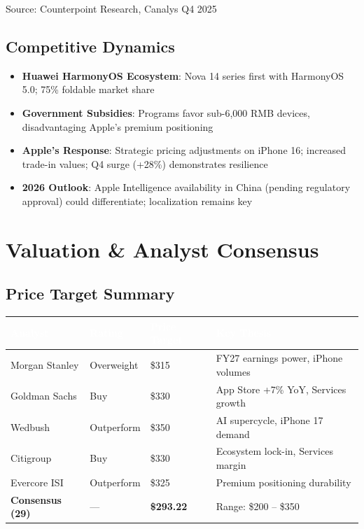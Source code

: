\documentclass[11pt,a4paper]{article}
\begin{document}
\vspace{6pt}
\textcolor{msgray}{\scriptsize Source: Counterpoint Research, Canalys Q4 2025}

\subsection{Competitive Dynamics}

\begin{itemize}
    \item \textbf{Huawei HarmonyOS Ecosystem}: Nova 14 series first with HarmonyOS 5.0; 75\% foldable market share
    \item \textbf{Government Subsidies}: Programs favor sub-6,000 RMB devices, disadvantaging Apple's premium positioning
    \item \textbf{Apple's Response}: Strategic pricing adjustments on iPhone 16; increased trade-in values; Q4 surge (+28\%) demonstrates resilience
    \item \textbf{2026 Outlook}: Apple Intelligence availability in China (pending regulatory approval) could differentiate; localization remains key
\end{itemize}

\section{Valuation \& Analyst Consensus}

\subsection{Price Target Summary}

\begin{center}
\begin{tabular}{L{3.5cm}C{2cm}R{2.5cm}L{4cm}}
\toprule
{}
\textcolor{white}{\textbf{Analyst}} & \textcolor{white}{\textbf{Rating}} & \textcolor{white}{\textbf{Price Target}} & \textcolor{white}{\textbf{Key Thesis}} \\
\midrule
Morgan Stanley & Overweight & \$315 & FY27 earnings power, iPhone volumes \\
Goldman Sachs & Buy & \$330 & App Store +7\% YoY, Services growth \\
Wedbush & Outperform & \$350 & AI supercycle, iPhone 17 demand \\
Citigroup & Buy & \$330 & Ecosystem lock-in, Services margin \\
Evercore ISI & Outperform & \$325 & Premium positioning durability \\
\midrule
\textbf{Consensus (29)} & --- & \textbf{\$293.22} & Range: \$200 -- \$350 \\
\bottomrule
\end{tabular}
\end{center}
\end{document}
